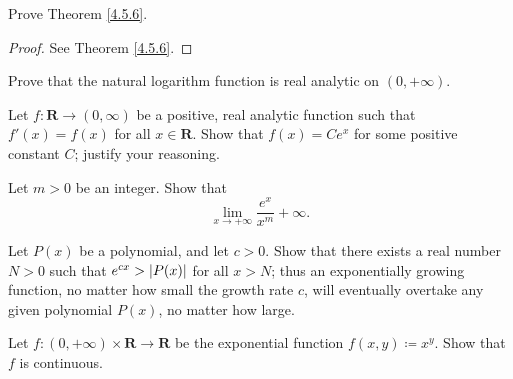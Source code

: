 \begin{exercise}\label{ex 4.5.5}
    Prove Theorem \ref{4.5.6}.
\end{exercise}

\begin{proof}
    See Theorem \ref{4.5.6}.
\end{proof}

\begin{exercise}\label{ex 4.5.6}
    Prove that the natural logarithm function is real analytic on \((0, +\infty)\).
\end{exercise}

\begin{exercise}\label{ex 4.5.7}
    Let \(f : \mathbf{R} \to (0, \infty)\) be a positive, real analytic function such that \(f'(x) = f(x)\) for all \(x \in \mathbf{R}\).
    Show that \(f(x) = C e^x\) for some positive constant \(C\);
    justify your reasoning.
\end{exercise}

\begin{exercise}\label{ex 4.5.8}
    Let \(m > 0\) be an integer.
    Show that
    \[
        \lim_{x \to +\infty} \frac{e^x}{x^m} +\infty.
    \]
\end{exercise}

\begin{exercise}\label{ex 4.5.9}
    Let \(P(x)\) be a polynomial, and let \(c > 0\).
    Show that there exists a real number \(N > 0\) such that \(e^{cx} > \abs*{P(x)}\) for all \(x > N\);
    thus an exponentially growing function, no matter how small the growth rate \(c\), will eventually overtake any given polynomial \(P(x)\), no matter how large.
\end{exercise}

\begin{exercise}\label{ex 4.5.10}
    Let \(f : (0, +\infty) \times \mathbf{R} \to \mathbf{R}\) be the exponential function \(f(x, y) \coloneqq x^y\).
    Show that \(f\) is continuous.
\end{exercise}